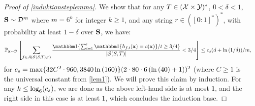 \begin{proof}[Proof of \cref{induktionsteplemma}]
We show that for any $T\in(\mathcal{X}\times \mathcal{Y})^{*}$, $0<\delta<1$, $\mathbf{S}\sim \mathcal{D}^{m}$ where $m=6^{k}$ for integer $k\geq1$, and any string $r\in([0:1]^{*})^{*}$, with probability at least $1-\delta$ over $\mathbf{S}$, we have: 
\begin{align}\label{highprobabilityeq3}
  \p_{\rx\sim \cD} \left[  
    \sum_{f\in \cA(\cS(S,T),r)} \frac{\ind\{\sum_{i=1}^{t} \ind\{h_{f,i}(\rx)=c(\rx)\}/t\geq 3/4\}}{|\cS(S,T)|}
     <3/4\right]
  \leq \cs(d+\ln{\left(1/\delta \right)})/m,
\end{align}
for $c_s= \max\{32C^{2}\cdot 960,3840\ln{\left(160 \right)}\}(2\cdot 80\cdot 6 \left(\ln{\left(40 \right)}+1\right))^2$ (where $C\geq 1$ is the universal constant from \cref{lem1}). We will prove this claim by induction. For any $k\leq \log_{6}(c_s)$, we are done as the above left-hand side is at most $1$, and the right side in this case is at least $1$, which concludes the induction base.


\end{proof}
